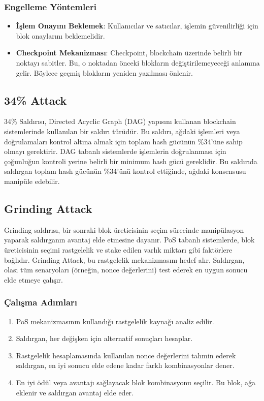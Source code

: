 \subsubsection{Engelleme Yöntemleri}

\begin{itemize}
    \item \textbf{İşlem Onayını Beklemek}: Kullanıcılar ve satıcılar, işlemin güvenilirliği için blok onaylarını beklemelidir.
    \item \textbf{Checkpoint Mekanizması}: Checkpoint, blockchain üzerinde belirli bir noktayı sabitler. Bu, o noktadan önceki blokların değiştirilemeyeceği anlamına gelir. Böylece geçmiş blokların yeniden yazılması önlenir.
\end{itemize}

\newpage

\subsection{34\% Attack}

34\% Saldırısı, Directed Acyclic Graph (DAG) yapısını kullanan blockchain sistemlerinde kullanılan bir saldırı türüdür. Bu saldırı, ağdaki işlemleri veya doğrulamaları kontrol altına almak için toplam hash gücünün \%34'üne sahip olmayı gerektirir. DAG  tabanlı sistemlerde işlemlerin doğrulanması için çoğunluğun kontroli yerine belirli bir minimum hash gücü gereklidir. Bu saldırıda saldırgan toplam hash gücünün \%34'ünü kontrol ettiğinde, ağdaki konsensusu manipüle edebilir.

\newpage

\subsection{Grinding Attack}

Grinding saldırısı, bir sonraki blok üreticisinin seçim sürecinde manipülasyon yaparak saldırganın avantaj elde etmesine dayanır. PoS tabanlı sistemlerde, blok üreticisinin seçimi rastgelelik ve stake edilen varlık miktarı gibi faktörlere bağlıdır. Grinding Attack, bu rastgelelik mekanizmasını hedef alır. Saldırgan, olası tüm senaryoları (örneğin, nonce değerlerini) test ederek en uygun sonucu elde etmeye çalışır.

\subsubsection{Çalışma Adımları}

\begin{enumerate}
    \item PoS mekanizmasının kullandığı rastgelelik kaynağı analiz edilir.
    \item Saldırgan, her değişken için alternatif sonuçları hesaplar.
    \item Rastgelelik hesaplamasında kullanılan nonce değerlerini tahmin ederek saldırgan, en iyi sonucu elde edene kadar farklı kombinasyonlar dener.
    \item En iyi ödül veya avantajı sağlayacak blok kombinasyonu seçilir. Bu blok, ağa eklenir ve saldırgan avantaj elde eder.
\end{enumerate}

